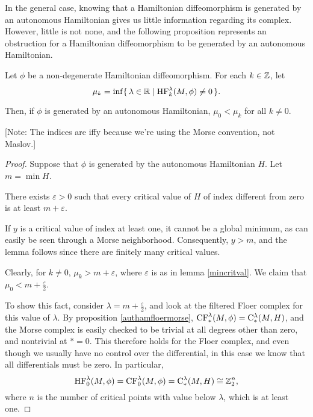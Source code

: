 In the general case, knowing that a Hamiltonian diffeomorphism is generated by an autonomous Hamiltonian gives us little information regarding its complex. However, little is not none, and the following proposition represents an obstruction for a Hamiltonian diffeomorphism to be generated by an autonomous Hamiltonian.

\begin{prop}
Let $\phi$ be a non-degenerate Hamiltonian diffeomorphism. For each $k \in \mathbb{Z}$, let
\begin{equation}
\mu_k = \inf \{\, \lambda \in \mathbb{R} \mid \mathrm{HF}_k^\lambda(M,\phi) \neq 0 \, \}.
\end{equation}

Then, if $\phi$ is generated by an autonomous Hamiltonian, $\mu_0 < \mu_k$ for all $k \neq 0$.

[Note: The indices are iffy because we're using the Morse convention, not Maslov.]
\end{prop}

\begin{proof}
Suppose that $\phi$ is generated by the autonomous Hamiltonian $H$. Let $m = \min H$.

\begin{lemma}\label{mincritval}
There exists $\varepsilon > 0$ such that every critical value of $H$ of index different from zero is at least $m+\varepsilon$.
\end{lemma}

\begin{lemmaproof}
If $y$ is a critical value of index at least one, it cannot be a global minimum, as can easily be seen through a Morse neighborhood. Consequently, $y > m$, and the lemma follows since there are finitely many critical values.
\end{lemmaproof}

Clearly, for $k \neq 0$, $\mu_k > m+\varepsilon$, where $\varepsilon$ is as in lemma \ref{mincritval}. We claim that $\mu_0 < m+\frac\varepsilon2$.

To show this fact, consider $\lambda = m+\frac\varepsilon2$, and look at the filtered Floer complex for this value of $\lambda$. By proposition \ref{authamfloermorse}, $\mathrm{CF}_*^\lambda(M,\phi) = \mathrm{C}_*^\lambda(M,H)$, and the Morse complex is easily checked to be trivial at all degrees other than zero, and nontrivial at $*=0$. This therefore holds for the Floer complex, and even though we usually have no control over the differential, in this case we know that all differentials must be zero. In particular,
\[\mathrm{HF}_0^\lambda(M,\phi) = \mathrm{CF}_0^\lambda(M,\phi) = \mathrm{C}_*^\lambda(M,H) \cong \mathbb{Z}_2^n,\]
where $n$ is the number of critical points with value below $\lambda$, which is at least one.
\end{proof}

